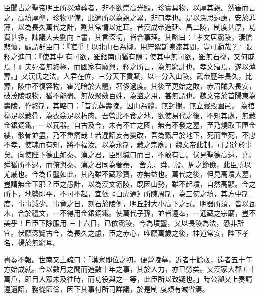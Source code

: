 \begin{pinyinscope}
 臣聞古之聖帝明王所以薄葬者，非不欲崇高光顯，珍寶具物，以厚其親。然審而言之，高墳厚壟，珍物畢備，此適所以為親之累，非曰孝也。是以深思遠慮，安於菲薄，以為長久萬代之計，割其常情以定耳。昔漢成帝造延、昌二陵，制度甚厚，功費甚多。諫議大夫劉向上書，其言深切，皆合事理。其略曰：「孝文居霸陵，淒愴悲懷，顧謂群臣曰：『嗟乎！以北山石為槨，用紵絮斮陳漆其間，豈可動哉？』張釋之進曰：『使其中
 有可欲，雖錮南山猶有隙；使其中無可欲，雖無石槨，又何戚焉！』夫死者無終極，而國家有廢興，釋之所言，為無窮計也。孝文寤焉，遂以薄葬。」又漢氏之法，人君在位，三分天下貢賦，以一分入山陵。武帝歷年長久，比葬，陵中不復容物，霍光暗於大體，奢侈過度。其後至更始之敗，赤眉賊入長安，破茂陵取物，猶不能盡。無故聚斂百姓，為盜之用，甚無謂也。魏文帝於首陽東為壽陵，作終制，其略曰：「昔堯葬壽陵，因山為體，無封樹，無立寢殿園邑，
 為棺槨足以藏骨，為衣衾足以朽肉。吾營此不食之地，欲使易代之後，不知其處，無藏金銀銅鐵，一以瓦器。自古及今，未有不亡之國，無有不發之墓，至乃燒取玉匣金縷，骸骨並盡，乃不重痛哉！若違詔妄有變改，吾為戮尸於地下，死而重死，不忠不孝，使魂而有知，將不福汝。以為永制，藏之宗廟。」魏文帝此制，可謂達於事矣。向使陛下德止如秦、漢之君，臣則緘口而已，不敢有言。伏見聖德高遠，堯、舜猶所不逮，而俯與秦、漢之君同為奢泰，
 舍堯、舜、殷、周之節儉，此臣所以尤戚也。今為丘壟如此，其內雖不藏珍寶，亦無益也。萬代之後，但見高墳大墓，豈謂無金玉耶？臣之愚計，以為漢文霸陵，既因山勢，雖不起墳，自然高顯。今之所卜，地勢即平，不可不起，宜依《白虎通》所陳周制，為三仞之墳，其方中制度，事事減少。事竟之日，刻石於陵側，明丘封大小高下之式。明器所須，皆以瓦木，合於禮文，一不得用金銀銅鐵。使萬代子孫，並皆遵奉，一通藏之宗廟，豈不美乎！且臣下除服用
 三十六日，已依霸陵，今為墳壟，又以長陵為法，恐非所宜。伏願深覽古今，為長久之慮，臣之赤心，唯願萬歲之後，神道常安，陛下孝名，揚於無窮耳。



 書奏不報。世南又上疏曰：「漢家即位之初，便營陵墓，近者十餘歲，遠者五十年方始成就。今以數月之間而造數十年之事，其於人力，亦已勞矣。又漢家大郡五十萬戶，即目人眾未及往時，而功役與之一等，此臣所以致疑也。」時公卿又上奏請遵遺詔，務從節儉，因下其事付所司詳議，於是制
 度頗有減省焉。




\end{pinyinscope}

